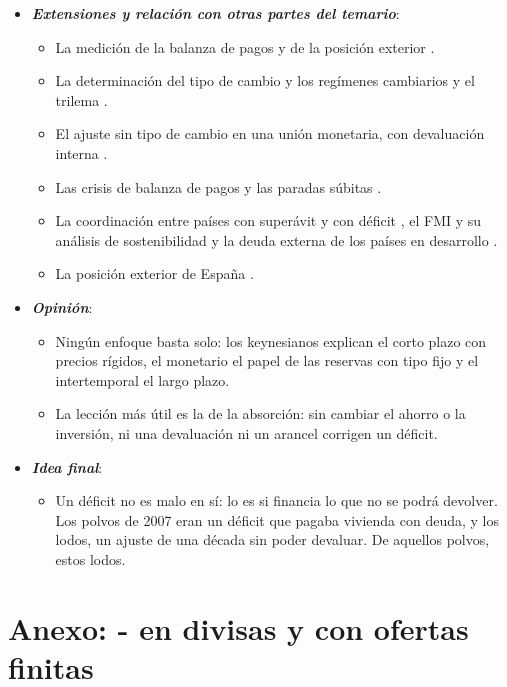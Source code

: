 \documentclass[11pt]{article}
\begin{document}
\begin{itemize}
\begin{itemize}
  \end{itemize}
\item \textbf{\emph{Extensiones y relación con otras partes del temario}}:
  \begin{itemize}
  \item La medición de la balanza de pagos y de la posición exterior .
  \item La determinación del tipo de cambio  y los regímenes cambiarios y el trilema .
  \item El ajuste sin tipo de cambio en una unión monetaria, con devaluación interna .
  \item Las crisis de balanza de pagos y las paradas súbitas .
  \item La coordinación entre países con superávit y con déficit , el FMI y su análisis de sostenibilidad  y la deuda externa de los países en desarrollo .
  \item La posición exterior de España .
  \end{itemize}
\item \textbf{\emph{Opinión}}:
  \begin{itemize}
  \item Ningún enfoque basta solo: los keynesianos explican el corto plazo con precios rígidos, el monetario el papel de las reservas con tipo fijo y el intertemporal el largo plazo.
  \item La lección más útil es la de la absorción: sin cambiar el ahorro o la inversión, ni una devaluación ni un arancel corrigen un déficit.
  \end{itemize}
\item \textbf{\emph{Idea final}}:
  \begin{itemize}
  \item Un déficit no es malo en sí: lo es si financia lo que no se podrá devolver. Los polvos de 2007 eran un déficit que pagaba vivienda con deuda, y los lodos, un ajuste de una década sin poder devaluar. De aquellos polvos, estos lodos.
  \end{itemize}
\end{itemize}

\clearpage
\appendix

\section{Anexo: - en divisas y con ofertas finitas}\label{anexo:marshall-lerner}
\end{document}
